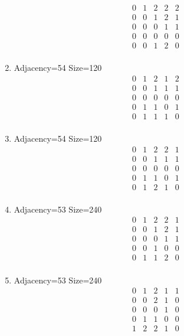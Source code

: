\documentclass[12pt]{article}
\begin{document}
\begin{multicols}{3}
\begin{enumerate}
\begin{equation*}
\begin{array}{ccccc}
0&1&2&2&2\\
0&0&1&2&1\\
0&0&0&1&1\\
0&0&0&0&0\\
0&0&1&2&0\\
\end{array}
\end{equation*}
\item Adjacency=54 Size=120
\begin{equation*}
\begin{array}{ccccc}
0&1&2&1&2\\
0&0&1&1&1\\
0&0&0&0&0\\
0&1&1&0&1\\
0&1&1&1&0\\
\end{array}
\end{equation*}
\item Adjacency=54 Size=120
\begin{equation*}
\begin{array}{ccccc}
0&1&2&2&1\\
0&0&1&1&1\\
0&0&0&0&0\\
0&1&1&0&1\\
0&1&2&1&0\\
\end{array}
\end{equation*}
\item Adjacency=53 Size=240
\begin{equation*}
\begin{array}{ccccc}
0&1&2&2&1\\
0&0&1&2&1\\
0&0&0&1&1\\
0&0&1&0&0\\
0&1&1&2&0\\
\end{array}
\end{equation*}
\item Adjacency=53 Size=240
\begin{equation*}
\begin{array}{ccccc}
0&1&2&1&1\\
0&0&2&1&0\\
0&0&0&1&0\\
0&1&1&0&0\\
1&2&2&1&0\\
\end{array}

\end{equation*}
\end{enumerate}
\end{multicols}
\end{document}
